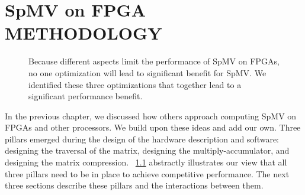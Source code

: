 \chapter{SpMV on FPGA METHODOLOGY}
\label{chp:method}

\begin{figure}
    \centering
    \caption[The three pillars of optimization for computing SpMV on FPGAs.]{Because different aspects limit the performance of SpMV on FPGAs, no one optimization will lead to significant benefit for SpMV. We identified these three optimizations that together lead to a significant performance benefit.}
    \label{fig:pillars}
\end{figure}

In the previous chapter, we discussed how others approach computing SpMV on FPGAs and other processors. We build upon these ideas and add our own. Three pillars emerged during the design of the hardware description and software: designing the traversal of the matrix, designing the multiply-accumulator, and designing the matrix compression. \figurename~\ref{fig:pillars} abstractly illustrates our view that all three pillars need to be in place to achieve competitive performance. The next three sections describe these pillars and the interactions between them.

